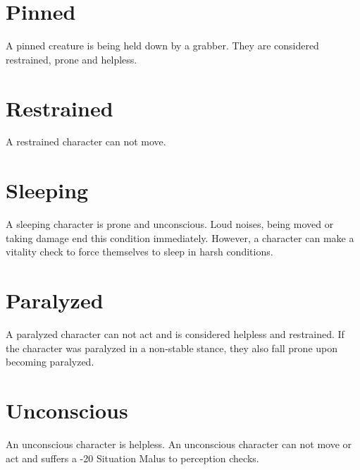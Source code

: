 \section{Pinned}\label{condition:pinned}
A pinned creature is being held down by a grabber.
They are considered restrained, prone and helpless.

\section{Restrained}\label{condition:restrained}
A restrained character can not move.

\section{Sleeping}\label{condition:sleeping}
A sleeping character is prone and unconscious.
Loud noises, being moved or taking damage end this condition immediately.
However, a character can make a vitality check to force themselves to sleep in harsh conditions.

\section{Paralyzed}\label{condition:paralyzed}
A paralyzed character can not act and is considered helpless and restrained.
If the character was paralyzed in a non-stable stance, they also fall prone upon becoming paralyzed.

\section{Unconscious}\label{condition:unconscious}
An unconscious character is helpless.
An unconscious character can not move or act and suffers a -20 Situation Malus to perception checks.